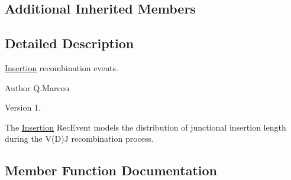 \subsection*{Additional Inherited Members}


\subsection{Detailed Description}
\hyperlink{classInsertion}{Insertion} recombination events. 

\begin{DoxyAuthor}{Author}
Q.\+Marcou 
\end{DoxyAuthor}
\begin{DoxyVersion}{Version}
1.
\end{DoxyVersion}
The \hyperlink{classInsertion}{Insertion} Rec\+Event models the distribution of junctional insertion length during the V(\+D)J recombination process. 

\subsection{Member Function Documentation}
\mbox{\label{classInsertion_a9c0f15989a298d7ddf7311c432f995b9}} 
